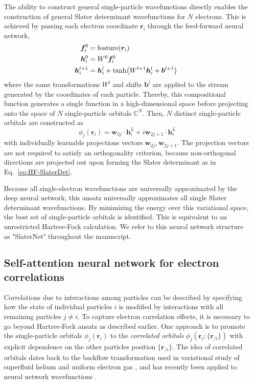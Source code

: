 \documentclass[
 reprint,
 amsmath,amssymb,
 aps, prx,
floatfix,longbibliography,
]{revtex4-2}
\begin{document}
The ability to construct general single-particle wavefunctions directly enables the construction of general Slater determinant wavefunctions for $N$ electrons. This is achieved by passing each electron coordinate $\bm r_i$ through the feed-forward neural network,
\begin{align}
    \bm f^0_i & = {\rm feature}(\bm r_i) \\
    \bm h^0_i & = W^0 \bm f^0_i \\
    \bm h^{l+1}_i & = \bm h^l_i + \tanh(W^{l+1} \bm h^{l}_i + \bm b^{l+1})\ \label{eq:NN-Slater-hl}
\end{align} 
where the same transformations $W^l$ and shifts $\bm b^l$ are applied to the stream generated by the coordinates of each particle.
Thereby, this compositional function generates a single function in a high-dimensional space before projecting onto the space of $N$ single-particle orbitals $\mathbb{C}^{N}$. 
Then, $N$ distinct single-particle orbitals are constructed as 
\begin{equation}
    \phi_j(\bm r_i) = \bm w_{2j} \cdot \bm h^{L}_i + i \bm w_{2j+1} \cdot \bm h^{L}_i
    \label{eq:NN-Slater-phi}
\end{equation} 
with individually learnable projections vectors  $\bm w_{2j}, \bm w_{2j+1}$.
The projection vectors are not required to satisfy an orthogonality criterion, because non-orthogonal directions are projected out upon forming the Slater determinant as in Eq.~\eqref{eq:HF-SlaterDet}. 

Because all single-electron wavefunctions are universally approximated by the deep neural network, this ansatz universally approximates all single Slater determinant wavefunctions. By minimizing the energy over this variational space, the best set of single-particle orbitals is identified. 
This is equivalent to an unrestricted Hartree-Fock calculation.
%
We refer to this neural network structure as "SlaterNet" throughout the manuscript. 


\subsection{Self-attention neural network for electron correlations}
\label{sec:NN-attn}

Correlations due to interactions among particles can be described by specifying how the state of individual particles $i$ is modified by interactions with all remaining particles $j \neq i$. 
To capture electron correlation effects, it is necessary to go beyond Hartree-Fock ansatz as described earlier. One approach is to promote the single-particle orbitals $\phi_j(\bm r_i)$ to the \emph{correlated orbitals} $\phi_j(\bm r_i; \{ \bm r_{/i}\})$ with explicit dependence on the other particles position $\{ \bm r_{/i}\}$. The idea of correlated orbitals dates back to the backflow transformation used in variational study of superfluid helium and uniform electron gas \cite{Feynman1956Jun, Kwon1993Oct}, and has recently been applied to neural network wavefunctions \cite{Luo2019Jun,Pfau2020Sep,vonGlehn2022Nov,Li2022Dec}. 
\end{document}
